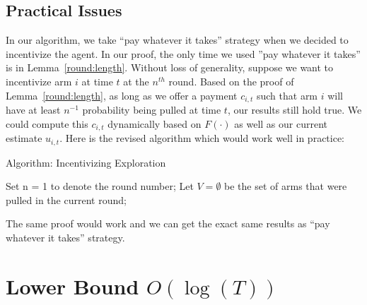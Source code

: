 \documentclass{article}
\begin{document}
\subsection{Practical Issues}
\label{sec:pi}

In our algorithm, we take ``pay whatever it takes'' strategy when we decided to incentivize the agent. In our proof, the only time we used ''pay whatever it takes'' is in Lemma~\ref{round:length}. Without loss of generality, suppose we want to incentivize arm $i$ at time $t$ at the $n^{th}$ round. Based on the proof of Lemma~\ref{round:length}, as long as we offer a payment $c_{i,t}$ such that arm $i$ will have at least $n^{-1}$ probability being pulled at time $t$, our results still hold true. We could compute this $c_{i,t}$ dynamically based on $F(\cdot)$ as well as our current estimate $u_{i,t}$. Here is the revised algorithm which would work well in practice:


\begin{algorithm}
\caption{Algorithm: Incentivizing Exploration}
\label{Alg2}
\begin{algorithmic}
\STATE Set n = 1 to denote the round number; Let $V=\emptyset$ be the set of arms that were pulled in the current round;
\ENDFOR

\end{algorithmic}
\end{algorithm}


The same proof would work and we can get the exact same results as ``pay whatever it takes'' strategy. 

\section{Lower Bound $O(\log(T))$}
\label{sec:lb}
\end{document}
